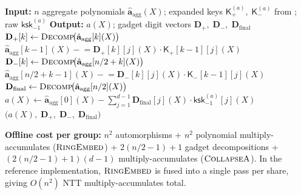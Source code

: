 \documentclass[11pt,a4paper]{article}
\begin{document}
\begin{algorithm}[H]
\caption{$\textsc{CollapseA}(\hat{\mathbf{a}}_{\mathrm{agg}}(X),\; \mathsf{K}_{+}^{(a)},\; \mathsf{K}_{-}^{(a)},\; \mathsf{ksk}_{-1}^{(a)})$: Full $a$-side Collapse.}
\label{alg:collapse-a}
\begin{algorithmic}[1]
\State \textbf{Input:} $n$ aggregate polynomials $\hat{\mathbf{a}}_{\mathrm{agg}}(X)$; expanded keys $\mathsf{K}_{+}^{(a)},\; \mathsf{K}_{-}^{(a)}$ from ; raw $\mathsf{ksk}_{-1}^{(a)}$
\State \textbf{Output:} $a(X)$; gadget digit vectors $\mathbf{D}_{+},\; \mathbf{D}_{-},\; \mathbf{D}_{\mathrm{final}}$
\Statex
\State {}
    \State $\mathbf{D}_{+}[k] \gets \textsc{Decomp}\!\bigl(\hat{\mathbf{a}}_{\mathrm{agg}}[k](X)\bigr)$
        \State $\hat{\mathbf{a}}_{\mathrm{agg}}[k\!-\!1](X) \mathrel{-}= \mathbf{D}_{+}[k][j](X) \cdot \mathsf{K}_{+}[k\!-\!1][j](X)$
    \EndFor
\EndFor
\Statex
\State {}
    \State $\mathbf{D}_{-}[k] \gets \textsc{Decomp}\!\bigl(\hat{\mathbf{a}}_{\mathrm{agg}}[n/2 + k](X)\bigr)$
        \State $\hat{\mathbf{a}}_{\mathrm{agg}}[n/2 + k\!-\!1](X) \mathrel{-}= \mathbf{D}_{-}[k][j](X) \cdot \mathsf{K}_{-}[k\!-\!1][j](X)$
    \EndFor
\EndFor
\Statex
\State {}
\State $\mathbf{D}_{\mathrm{final}} \gets \textsc{Decomp}\!\bigl(\hat{\mathbf{a}}_{\mathrm{agg}}[n/2](X)\bigr)$
\State $a(X) \gets \hat{\mathbf{a}}_{\mathrm{agg}}[0](X) - \sum_{j=1}^{d-1} \mathbf{D}_{\mathrm{final}}[j](X) \cdot \mathsf{ksk}_{-1}^{(a)}[j](X)$
\State \Return $\bigl(a(X),\; \mathbf{D}_{+},\; \mathbf{D}_{-},\; \mathbf{D}_{\mathrm{final}}\bigr)$
\end{algorithmic}
\end{algorithm}

\textbf{Offline cost per group:}
$n^2$ automorphisms + $n^2$ polynomial multiply-accumulates ($\textsc{RingEmbed}$) + $2(n/2 - 1) + 1$ gadget decompositions + $(2(n/2 - 1) + 1)(d\!-\!1)$ multiply-accumulates ($\textsc{CollapseA}$).
In the reference implementation, $\textsc{RingEmbed}$ is fused into a single pass per share, giving $O(n^2)$ NTT multiply-accumulates total.
\end{document}
